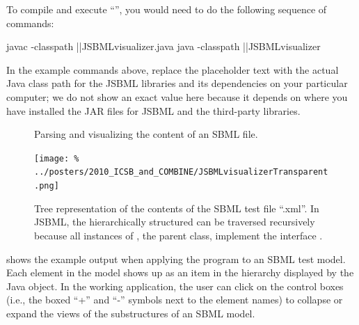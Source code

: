 To compile and execute ``'', you would need to do
the following sequence of commands:

\newcommand{\classpath}{\code{\emph{\color{winered}classpath}}\xspace}

\begin{example}[style=bash, title={Compiling and executing the example program.}]
  javac -classpath |\classpath|JSBMLvisualizer.java
  java -classpath |\classpath|JSBMLvisualizer
\end{example}

In the example commands above, replace the placeholder text \classpath with
the actual Java class path for the JSBML libraries and its dependencies on
your particular computer; we do not show an exact value here because it
depends on where you have installed the JAR files for JSBML and the
third-party libraries.

\begin{figure}[ht]
  \caption{Parsing and visualizing the content of an SBML file.}
  \label{fig:JSBMLvisualizer-source}
\end{figure}

\begin{figure}
  \centering
  \setlength{\captionmargin}{1.8em}
  \texttt{[image: \%
    ../posters/2010\_ICSB\_and\_COMBINE/JSBMLvisualizerTransparent.png]}
  \caption[Tree representation of an SBML file]{Tree representation of
    the contents of the SBML test file ``.xml''. In JSBML,
    the hierarchically structured \SBMLDocument can be traversed
    recursively because all instances of \SBase, the parent class,
    implement the interface \TreeNode.}
  \label{fig:JSBMLvisualizer-output}
\end{figure}
 shows the example output when
applying the program to an SBML test model.  Each
element in the model shows up as an item in the hierarchy displayed by the
Java \JTree object. In the working application, the user can click on the
control boxes (i.e., the boxed ``+'' and ``-'' symbols next to the element
names) to collapse or expand the views of the substructures of an SBML
model.

